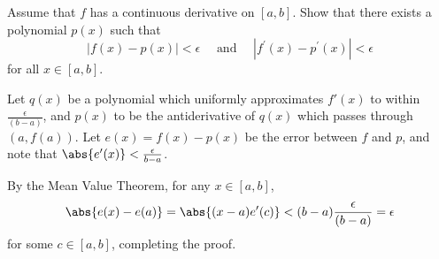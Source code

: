 \begin{exercise}
    Assume that $f$ has a continuous derivative on $[a, b]$. Show that there exists a polynomial $p(x)$ such that
$$
|f(x)-p(x)|<\epsilon \quad \text { and } \quad\left|f^{\prime}(x)-p^{\prime}(x)\right|<\epsilon
$$
for all $x \in[a, b]$.
\end{exercise}
\begin{solution}
Let \(q(x)\) be a polynomial which uniformly approximates \(f'(x)\) to within \(\frac{\epsilon}{(b-a)}\), and \(p(x)\) to be the antiderivative of \(q(x)\) which passes through \((a, f(a))\). Let \(e(x) = f(x) - p(x)\) be the error between \(f\) and \(p\), and note that \(\abs{e'(x)} < \frac{\epsilon}{b-a}\).

    By the Mean Value Theorem, for any \(x \in [a, b]\),
\[\abs{e(x) - e(a)} = \abs{(x-a)e'(c)} < (b-a) \frac{\epsilon}{(b-a)} = \epsilon\]
for some \(c \in [a,b]\), completing the proof.
\end{solution}
